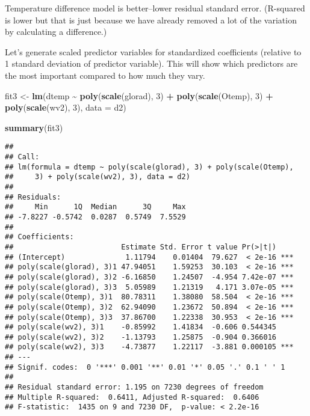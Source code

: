 \documentclass[
]{article}
\newenvironment{Shaded}{\begin{snugshade}}{\end{snugshade}}
\newcommand{\AttributeTok}[1]{\textcolor[rgb]{0.13,0.29,0.53}{#1}}
\newcommand{\DecValTok}[1]{\textcolor[rgb]{0.00,0.00,0.81}{#1}}
\newcommand{\FunctionTok}[1]{\textcolor[rgb]{0.13,0.29,0.53}{\textbf{#1}}}
\newcommand{\NormalTok}[1]{#1}
\newcommand{\OtherTok}[1]{\textcolor[rgb]{0.56,0.35,0.01}{#1}}
\newcommand{\SpecialCharTok}[1]{\textcolor[rgb]{0.81,0.36,0.00}{\textbf{#1}}}
\begin{document}
Temperature difference model is better--lower residual standard error.
(R-squared is lower but that is just because we have already removed a
lot of the variation by calculating a difference.)

Let's generate scaled predictor variables for standardized coefficients
(relative to 1 standard deviation of predictor variable). This will show
which predictors are the most important compared to how much they vary.

\begin{Shaded}
\begin{Highlighting}[]
\NormalTok{fit3 }\OtherTok{\textless{}{-}} \FunctionTok{lm}\NormalTok{(dtemp }\SpecialCharTok{\textasciitilde{}} \FunctionTok{poly}\NormalTok{(}\FunctionTok{scale}\NormalTok{(glorad), }\DecValTok{3}\NormalTok{) }\SpecialCharTok{+} \FunctionTok{poly}\NormalTok{(}\FunctionTok{scale}\NormalTok{(Otemp), }\DecValTok{3}\NormalTok{) }\SpecialCharTok{+} \FunctionTok{poly}\NormalTok{(}\FunctionTok{scale}\NormalTok{(wv2), }\DecValTok{3}\NormalTok{), }\AttributeTok{data =}\NormalTok{ d2)}
\end{Highlighting}
\end{Shaded}

\begin{Shaded}
\begin{Highlighting}[]
\FunctionTok{summary}\NormalTok{(fit3)}
\end{Highlighting}
\end{Shaded}

\begin{verbatim}
## 
## Call:
## lm(formula = dtemp ~ poly(scale(glorad), 3) + poly(scale(Otemp), 
##     3) + poly(scale(wv2), 3), data = d2)
## 
## Residuals:
##     Min      1Q  Median      3Q     Max 
## -7.8227 -0.5742  0.0287  0.5749  7.5529 
## 
## Coefficients:
##                         Estimate Std. Error t value Pr(>|t|)    
## (Intercept)              1.11794    0.01404  79.627  < 2e-16 ***
## poly(scale(glorad), 3)1 47.94051    1.59253  30.103  < 2e-16 ***
## poly(scale(glorad), 3)2 -6.16850    1.24507  -4.954 7.42e-07 ***
## poly(scale(glorad), 3)3  5.05989    1.21319   4.171 3.07e-05 ***
## poly(scale(Otemp), 3)1  80.78311    1.38080  58.504  < 2e-16 ***
## poly(scale(Otemp), 3)2  62.94090    1.23672  50.894  < 2e-16 ***
## poly(scale(Otemp), 3)3  37.86700    1.22338  30.953  < 2e-16 ***
## poly(scale(wv2), 3)1    -0.85992    1.41834  -0.606 0.544345    
## poly(scale(wv2), 3)2    -1.13793    1.25875  -0.904 0.366016    
## poly(scale(wv2), 3)3    -4.73877    1.22117  -3.881 0.000105 ***
## ---
## Signif. codes:  0 '***' 0.001 '**' 0.01 '*' 0.05 '.' 0.1 ' ' 1
## 
## Residual standard error: 1.195 on 7230 degrees of freedom
## Multiple R-squared:  0.6411, Adjusted R-squared:  0.6406 
## F-statistic:  1435 on 9 and 7230 DF,  p-value: < 2.2e-16
\end{verbatim}
\end{document}
